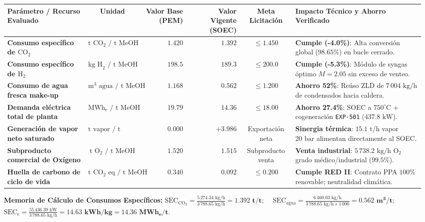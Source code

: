\documentclass[10pt,landscape]{article}
\newcommand{\badgegreen}[1]{\colorbox{badgegreen}{\textbf{\color{emeraldgreen}\fontsize{6.8pt}{8pt}\selectfont #1}}}
\newcommand{\badgeblue}[1]{\colorbox{badgeblue}{\textbf{\color{accentcyan!80!black}\fontsize{6.8pt}{8pt}\selectfont #1}}}
\begin{document}
\scriptsize
\renewcommand{\arraystretch}{1.20}
\begin{tabularx}{\textwidth}{p{4.2cm} c r r c X}
  \toprule
  \rowcolor{tableheader}
  \textbf{\color{white}Parámetro / Recurso Evaluado} & \textbf{\color{white}Unidad} & \textbf{\color{white}Valor Base (PEM)} & \textbf{\color{white}Valor Vigente (SOEC)} & \textbf{\color{white}Meta Licitación} & \textbf{\color{white}Impacto Técnico y Ahorro Verificado} \\
  \midrule
  \rowcolor{roweven}
  \textbf{Consumo específico de $\text{CO}_2$} & $\text{t CO}_2\text{ / t MeOH}$ & $1.420$ & $\mathbf{1.392}$ & $\le 1.450$ & \badgegreen{Cumple (-4.0\%)}: Alta conversión global ($98.65\%$) en bucle cerrado. \\
  \rowcolor{rowodd}
  \textbf{Consumo específico de $\text{H}_2$} & $\text{kg H}_2\text{ / t MeOH}$ & $198.5$ & $\mathbf{189.3}$ & $\le 200.0$ & \badgegreen{Cumple (-5.3\%)}: Módulo de syngas óptimo $M = 2.05$ sin exceso de venteo. \\
  \rowcolor{roweven}
  \textbf{Consumo de agua fresca make-up} & $\text{m}^3\text{ agua / t MeOH}$ & $1.168$ & $\mathbf{0.562}$ & $\le 1.200$ & \badgegreen{Ahorro 52\%}: Reúso ZLD de $7\,004\text{ kg/h}$ de condensados hacia caldera. \\
  \rowcolor{rowodd}
  \textbf{Demanda eléctrica total de planta} & $\text{MWh}_{\text{e}}\text{ / t MeOH}$ & $19.79$ & $\mathbf{14.36}$ & $\le 18.00$ & \badgegreen{Ahorro 27.4\%}: SOEC a $750^\circ\text{C}$ + cogeneración \texttt{EXP-501} ($437.8\text{ kW}$). \\
  \rowcolor{roweven}
  \textbf{Generación de vapor neto saturado} & $\text{t vapor / t MeOH}$ & $0.000$ & $\mathbf{+3.986}$ & Exportación neta & \badgegreen{Sinergia térmica}: $15.1\text{ t/h}$ vapor $20\text{ bar}$ alimentan directamente al SOEC. \\
  \rowcolor{rowodd}
  \textbf{Subproducto comercial de Oxígeno} & $\text{t O}_2\text{ / t MeOH}$ & $1.520$ & $\mathbf{1.515}$ & Subproducto venta & \badgeblue{Venta industrial}: $5\,738.2\text{ kg/h}$ $\text{O}_2$ grado médico/industrial ($99.5\%$). \\
  \rowcolor{roweven}
  \textbf{Huella de carbono de ciclo de vida} & $\text{t CO}_2\text{ eq / t MeOH}$ & $0.340$ & $\mathbf{0.092}$ & $\le 0.200$ & \badgegreen{Cumple RED II}: Contrato PPA $100\%$ renovable; neutralidad climática. \\
  \bottomrule
\end{tabularx}

\vspace{2pt}
\begin{tcolorbox}[colback=white,colframe=navyblue!40,arc=1.5mm,boxrule=0.6pt,top=2pt,bottom=2pt,left=6pt,right=6pt]
  \scriptsize
  \textbf{\color{navyblue}Memoria de Cálculo de Consumos Específicos:}
  $\text{SEC}_{\text{CO}_2} = \frac{5\,274.34\text{ kg/h}}{3\,788.65\text{ kg/h}} = \mathbf{1.392\text{ t/t}}$; \ \ 
  $\text{SEC}_{\text{agua}} = \frac{6\,460.03\text{ kg/h}}{3\,788.65\text{ kg/h} \times 1\,000} = \mathbf{0.562\text{ m}^3\text{/t}}$; \ \ 
  $\text{SEC}_{\text{e}} = \frac{55\,436.39\text{ kW}}{3\,788.65\text{ kg/h}} = \mathbf{14.63\text{ kWh/kg}} = \mathbf{14.36\text{ MWh}_{\text{e}}\text{/t}}$.
\end{tcolorbox}
\end{document}
